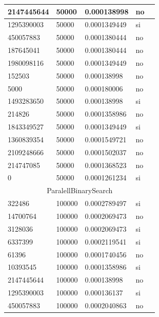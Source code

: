 \documentclass[12pt, fleqn]{article}                             %
\theoremstyle{break}                                            %
\begin{document}
\begin{longtable}{|m{5em}|m{5em}|m{10em}|m{5em}|@{}m{0pt}@{}}
            2147445644& 50000  & 0.000138998 & no &\\[1em]    \hline
            1295390003& 50000  & 0.0001349449 & si &\\[1em]    \hline
            450057883& 50000  & 0.0001380444 & no &\\[1em]    \hline
            187645041& 50000  & 0.0001380444 & no &\\[1em]    \hline
            1980098116& 50000  & 0.0001349449 & no &\\[1em]    \hline
            152503& 50000  & 0.000138998 & no &\\[1em]    \hline
            5000& 50000  & 0.000180006 & no &\\[1em]    \hline
            1493283650& 50000  & 0.000138998 & si &\\[1em]    \hline
            214826& 50000  & 0.0001358986 & no &\\[1em]    \hline
            1843349527& 50000  & 0.0001349449 & si &\\[1em]    \hline
            1360839354& 50000  & 0.0001549721 & no &\\[1em]    \hline
            2109248666& 50000  & 0.0001502037 & no &\\[1em]    \hline
            214747085& 50000  & 0.0001368523 & no &\\[1em]    \hline
            0& 50000  & 0.0001261234 & si &\\[1em]    \hline
            \multicolumn{5}{|c|}{ParalellBinarySearch}   \\          \hline
            322486& 100000  & 0.0002789497 & si &\\[1em]    \hline
            14700764& 100000  & 0.0002069473 & no &\\[1em]    \hline
            3128036& 100000  & 0.0002069473 & si &\\[1em]    \hline
            6337399& 100000  & 0.0002119541 & si &\\[1em]    \hline
            61396& 100000  & 0.0001740456 & no &\\[1em]    \hline
            10393545& 100000  & 0.0001358986 & si &\\[1em]    \hline
            2147445644& 100000  & 0.000138998 & no &\\[1em]    \hline
            1295390003& 100000  & 0.000136137 & si &\\[1em]    \hline
            450057883& 100000  & 0.0002040863 & no &\\[1em]    \hline

\end{longtable}
\end{document}
